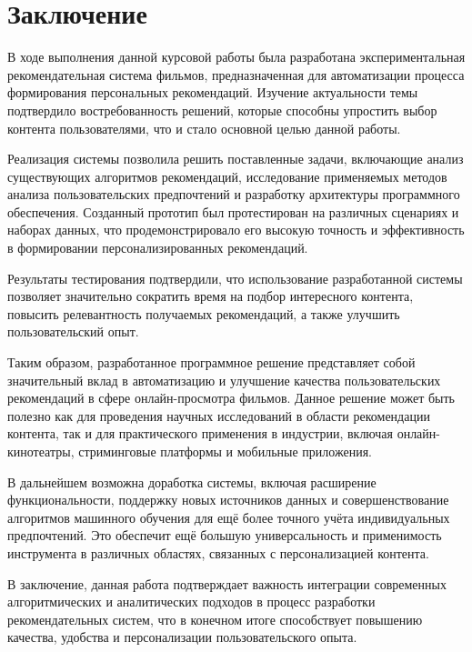 \chapter*{Заключение}
В ходе выполнения данной курсовой работы была разработана экспериментальная рекомендательная система фильмов,
предназначенная для автоматизации процесса формирования персональных рекомендаций.
Изучение актуальности темы подтвердило востребованность решений, которые способны упростить выбор контента
пользователями, что и стало основной целью данной работы.

Реализация системы позволила решить поставленные задачи, включающие анализ существующих алгоритмов рекомендаций,
исследование применяемых методов анализа пользовательских предпочтений и разработку архитектуры программного обеспечения.
Созданный прототип был протестирован на различных сценариях и наборах данных, что продемонстрировало его высокую точность
и эффективность в формировании персонализированных рекомендаций.

Результаты тестирования подтвердили, что использование разработанной системы позволяет значительно сократить время
на подбор интересного контента, повысить релевантность получаемых рекомендаций, а также улучшить пользовательский опыт.

Таким образом, разработанное программное решение представляет собой значительный вклад в автоматизацию и улучшение
качества пользовательских рекомендаций в сфере онлайн-просмотра фильмов.
Данное решение может быть полезно как для проведения научных исследований в области рекомендации контента, так и для
практического применения в индустрии, включая онлайн-кинотеатры, стриминговые платформы и мобильные приложения.

В дальнейшем возможна доработка системы, включая расширение функциональности, поддержку новых источников данных
и совершенствование алгоритмов машинного обучения для ещё более точного учёта индивидуальных предпочтений.
Это обеспечит ещё большую универсальность и применимость инструмента в различных областях, связанных с персонализацией контента.

В заключение, данная работа подтверждает важность интеграции современных алгоритмических и аналитических подходов в процесс
разработки рекомендательных систем, что в конечном итоге способствует повышению качества, удобства и персонализации пользовательского опыта.

